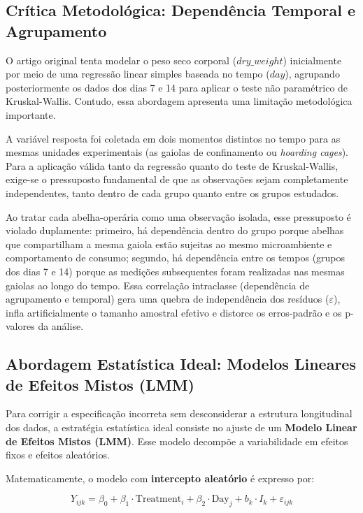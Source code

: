 \documentclass[
  brazilian,
  12pt,
  a4paper,
]{article}
\begin{document}
\subsection{Crítica Metodológica: Dependência Temporal e Agrupamento}

O artigo original tenta modelar o peso seco corporal (\(dry\_weight\))
inicialmente por meio de uma regressão linear simples baseada no tempo
(\(day\)), agrupando posteriormente os dados dos dias 7 e 14 para
aplicar o teste não paramétrico de Kruskal-Wallis. Contudo, essa
abordagem apresenta uma limitação metodológica importante.

A variável resposta foi coletada em dois momentos distintos no tempo
para as mesmas unidades experimentais (as gaiolas de confinamento ou
\textit{hoarding cages}). Para a aplicação válida tanto da regressão
quanto do teste de Kruskal-Wallis, exige-se o pressuposto fundamental de
que as observações sejam completamente independentes, tanto dentro de
cada grupo quanto entre os grupos estudados.

Ao tratar cada abelha-operária como uma observação isolada, esse
pressuposto é violado duplamente: primeiro, há dependência dentro do
grupo porque abelhas que compartilham a mesma gaiola estão sujeitas ao
mesmo microambiente e comportamento de consumo; segundo, há dependência
entre os tempos (grupos dos dias 7 e 14) porque as medições subsequentes
foram realizadas nas mesmas gaiolas ao longo do tempo. Essa correlação
intraclasse (dependência de agrupamento e temporal) gera uma quebra de
independência dos resíduos (\(\varepsilon\)), infla artificialmente o
tamanho amostral efetivo e distorce os erros-padrão e os p-valores da
análise.

\subsection{Abordagem Estatística Ideal: Modelos Lineares de Efeitos Mistos (LMM)}

Para corrigir a especificação incorreta sem desconsiderar a estrutura
longitudinal dos dados, a estratégia estatística ideal consiste no
ajuste de um \textbf{Modelo Linear de Efeitos Mistos (LMM)}. Esse modelo
decompõe a variabilidade em efeitos fixos e efeitos aleatórios.

Matematicamente, o modelo com \textbf{intercepto aleatório} é expresso
por:

\begin{equation}
Y_{ijk} = \beta_0 + \beta_1 \cdot \text{Treatment}_i + \beta_2 \cdot \text{Day}_j + b_k \cdot I_k + \varepsilon_{ijk}
\end{equation}
\end{document}
